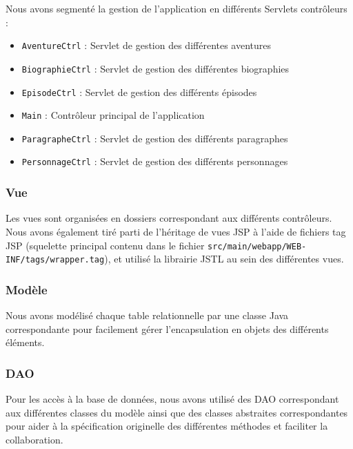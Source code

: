 \documentclass[a4paper, 11pt, titlepage]{article}
\begin{document}
Nous avons segmenté la gestion de l'application en différents Servlets contrôleurs :
\begin{itemize}
\item
\lstinline!AventureCtrl! : Servlet de gestion des différentes aventures

\item
\lstinline!BiographieCtrl! : Servlet de gestion des différentes biographies

\item
\lstinline!EpisodeCtrl! : Servlet de gestion des différents épisodes

\item
\lstinline!Main! : Contrôleur principal de l'application

\item
\lstinline!ParagrapheCtrl! : Servlet de gestion des différents paragraphes

\item
\lstinline!PersonnageCtrl! : Servlet de gestion des différents personnages
\end{itemize}


\subsubsection {Vue}

Les vues sont organisées en dossiers correspondant aux différents contrôleurs. Nous avons également tiré parti de l'héritage de vues JSP à l'aide de fichiers tag JSP (squelette principal contenu dans le fichier \lstinline!src/main/webapp/WEB-INF/tags/wrapper.tag!), et utilisé la librairie JSTL au sein des différentes vues.


\subsubsection {Modèle}

Nous avons modélisé chaque table relationnelle par une classe Java correspondante pour facilement gérer l'encapsulation en objets des différents éléments.


\subsubsection {DAO}

Pour les accès à la base de données, nous avons utilisé des DAO correspondant aux différentes classes du modèle ainsi que des classes abstraites correspondantes pour aider à la spécification originelle des différentes méthodes et faciliter la collaboration.
\end{document}
